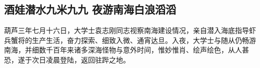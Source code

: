 \documentclass[12pt, a4paper]{book}
\begin{document}
\begin{CJK}{UTF8}{gbsn}
    \chapter{酒娃潜水九米九九 夜游南海白浪滔滔}
    
    葫芦三年七月十六日，大学士袁志刚同志视察南海建设情况，亲自潜入海底指导虾兵蟹将的生产生活，奋力探索、细致入微、通宵达旦。入夜，大学士与随从仍畅游南海，并细数千百年来诸多深海怪物与意外时间，惟妙惟肖、绘声绘色，从人甚恐，遂于次日凌晨登陆，返回驻跸之地。
    
    \appendix

    

\end{CJK}
\end{document}
